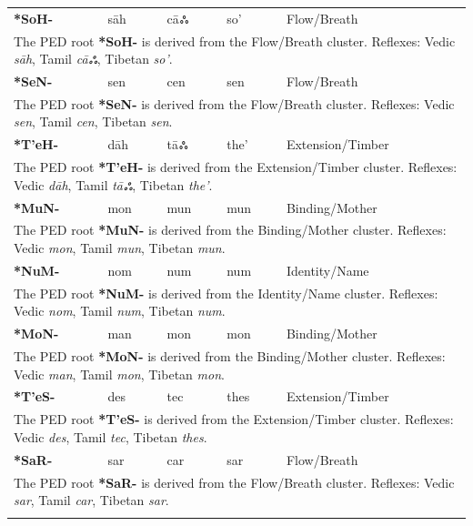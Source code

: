 \begin{longtable}{p{} p{} p{} p{} p{}}
\textbf{*SoH-} & sāh & cāஃ & so' & Flow/Breath \\ 
\multicolumn{5}{p{\textwidth}}{\small The PED root \textbf{*SoH-} is derived from the Flow/Breath cluster. Reflexes: Vedic \textit{sāh}, Tamil \textit{cāஃ}, Tibetan \textit{so'}. } \\ \addlinespace 
\textbf{*SeN-} & sen & cen & sen & Flow/Breath \\ 
\multicolumn{5}{p{\textwidth}}{\small The PED root \textbf{*SeN-} is derived from the Flow/Breath cluster. Reflexes: Vedic \textit{sen}, Tamil \textit{cen}, Tibetan \textit{sen}. } \\ \addlinespace 
\textbf{*T'eH-} & dāh & tāஃ & the' & Extension/Timber \\ 
\multicolumn{5}{p{\textwidth}}{\small The PED root \textbf{*T'eH-} is derived from the Extension/Timber cluster. Reflexes: Vedic \textit{dāh}, Tamil \textit{tāஃ}, Tibetan \textit{the'}. } \\ \addlinespace 
\textbf{*MuN-} & mon & mun & mun & Binding/Mother \\ 
\multicolumn{5}{p{\textwidth}}{\small The PED root \textbf{*MuN-} is derived from the Binding/Mother cluster. Reflexes: Vedic \textit{mon}, Tamil \textit{mun}, Tibetan \textit{mun}. } \\ \addlinespace 
\textbf{*NuM-} & nom & num & num & Identity/Name \\ 
\multicolumn{5}{p{\textwidth}}{\small The PED root \textbf{*NuM-} is derived from the Identity/Name cluster. Reflexes: Vedic \textit{nom}, Tamil \textit{num}, Tibetan \textit{num}. } \\ \addlinespace 
\textbf{*MoN-} & man & mon & mon & Binding/Mother \\ 
\multicolumn{5}{p{\textwidth}}{\small The PED root \textbf{*MoN-} is derived from the Binding/Mother cluster. Reflexes: Vedic \textit{man}, Tamil \textit{mon}, Tibetan \textit{mon}. } \\ \addlinespace 
\textbf{*T'eS-} & des & tec & thes & Extension/Timber \\ 
\multicolumn{5}{p{\textwidth}}{\small The PED root \textbf{*T'eS-} is derived from the Extension/Timber cluster. Reflexes: Vedic \textit{des}, Tamil \textit{tec}, Tibetan \textit{thes}. } \\ \addlinespace 
\textbf{*SaR-} & sar & car & sar & Flow/Breath \\ 
\multicolumn{5}{p{\textwidth}}{\small The PED root \textbf{*SaR-} is derived from the Flow/Breath cluster. Reflexes: Vedic \textit{sar}, Tamil \textit{car}, Tibetan \textit{sar}. } \\ \addlinespace 

\end{longtable}
